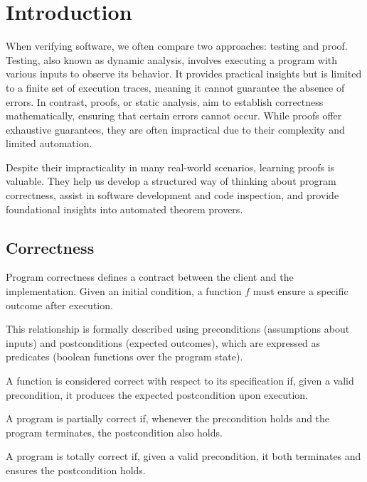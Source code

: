 \section{Introduction}

When verifying software, we often compare two approaches: testing and proof. 
Testing, also known as dynamic analysis, involves executing a program with various inputs to observe its behavior.
It provides practical insights but is limited to a finite set of execution traces, meaning it cannot guarantee the absence of errors. 
In contrast, proofs, or static analysis, aim to establish correctness mathematically, ensuring that certain errors cannot occur. 
While proofs offer exhaustive guarantees, they are often impractical due to their complexity and limited automation.

Despite their impracticality in many real-world scenarios, learning proofs is valuable. 
They help us develop a structured way of thinking about program correctness, assist in software development and code inspection, and provide foundational insights into automated theorem provers.

\subsection{Correctness}
Program correctness defines a contract between the client and the implementation.
Given an initial condition, a function $f$ must ensure a specific outcome after execution.

This relationship is formally described using preconditions (assumptions about inputs) and postconditions (expected outcomes), which are expressed as predicates (boolean functions over the program state).

\begin{definition}
    A function is considered correct with respect to its specification if, given a valid precondition, it produces the expected postcondition upon execution.
\end{definition}

\begin{definition}
    A program is partially correct if, whenever the precondition holds and the program terminates, the postcondition also holds.
\end{definition}

\begin{definition}
    A program is totally correct if, given a valid precondition, it both terminates and ensures the postcondition holds.
\end{definition}